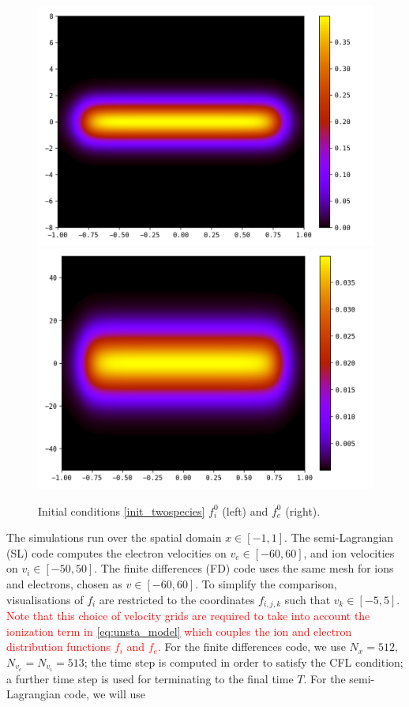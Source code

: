 \documentclass{article}
\numberwithin{equation}{section}
\newcommand{\imh}{\textheight} %
\begin{document}
\begin{figure}
	\centering
	\renewcommand{\imh}{0.33\linewidth}
	\includegraphics[height=\imh]{images/fi_init}
	\includegraphics[height=\imh]{images/fe_init}
	\caption{Initial conditions \eqref{init_twospecies} $f_i^0$ (left) and $f_e^0$ (right).}
	\label{fig:init_cond}
\end{figure}

The simulations run over the spatial domain $x \in [-1,1]$. The semi-Lagrangian (SL) code computes the electron velocities on $v_e \in [-60, 60]$, and ion velocities on $v_i \in [-50, 50]$. The finite differences (FD) code uses the same mesh for ions and electrons, chosen as $v\in[-60,60]$. To simplify the comparison, visualisations of $f_i$ are restricted to the coordinates $f_{i,j,k}$ such that $v_k \in [-5,5]$. \textcolor{red}{Note that 
this choice of velocity grids are required to take into account the ionization term in \eqref{eq:unsta_model} which couples the ion and electron 
distribution functions $f_i$ and $f_e$. }
For the finite differences code, we use $N_x=512$, $N_{v_e}=N_{v_i}=513$; the time step is computed in order to satisfy the CFL condition; a further time step is used for terminating to the final time $T$.  
For the semi-Lagrangian code, we will use
\end{document}

